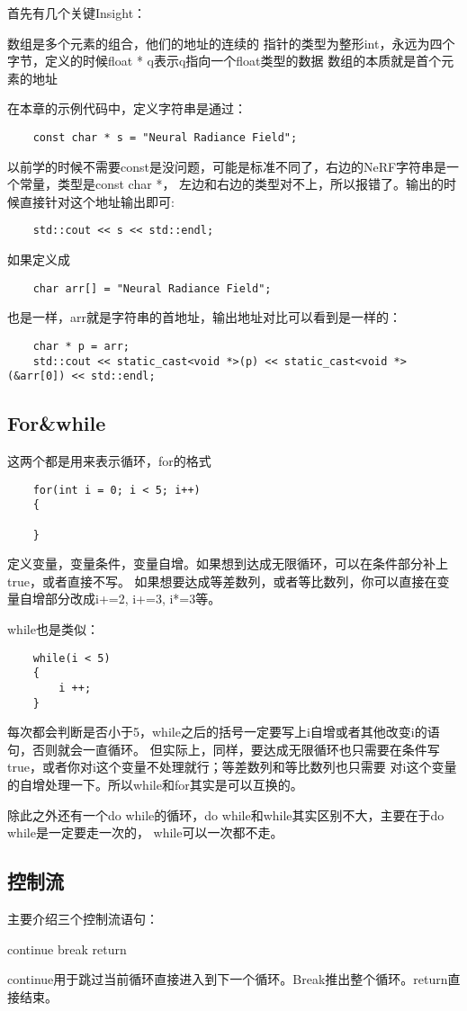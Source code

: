 \documentclass{article}
\begin{document}
\begin{sloppypar}
 首先有几个关键Insight：
 \begin{outline}
	\1 数组是多个元素的组合，他们的地址的连续的
	\1 指针的类型为整形int，永远为四个字节，定义的时候float * q表示q指向一个float类型的数据
	\1 数组的本质就是首个元素的地址
 \end{outline}

在本章的示例代码中，定义字符串是通过：
\begin{lstlisting}
	const char * s = "Neural Radiance Field";
\end{lstlisting}
以前学的时候不需要const是没问题，可能是标准不同了，右边的NeRF字符串是一个常量，类型是const char *，
左边和右边的类型对不上，所以报错了。输出的时候直接针对这个地址输出即可:
\begin{lstlisting}
	std::cout << s << std::endl;
\end{lstlisting}
如果定义成
\begin{lstlisting}
	char arr[] = "Neural Radiance Field";
\end{lstlisting}
也是一样，arr就是字符串的首地址，输出地址对比可以看到是一样的：
\begin{lstlisting}
	char * p = arr;
    std::cout << static_cast<void *>(p) << static_cast<void *>(&arr[0]) << std::endl;
\end{lstlisting}

\subsection{For\&while}
这两个都是用来表示循环，for的格式
\begin{lstlisting}
	for(int i = 0; i < 5; i++)
	{

	}
\end{lstlisting}
定义变量，变量条件，变量自增。如果想到达成无限循环，可以在条件部分补上true，或者直接不写。
如果想要达成等差数列，或者等比数列，你可以直接在变量自增部分改成i+=2, i+=3, i*=3等。

while也是类似：
\begin{lstlisting}
	while(i < 5)
	{
		i ++;
	}
\end{lstlisting}
每次都会判断是否小于5，while之后的括号一定要写上i自增或者其他改变i的语句，否则就会一直循环。
但实际上，同样，要达成无限循环也只需要在条件写true，或者你对i这个变量不处理就行；等差数列和等比数列也只需要
对i这个变量的自增处理一下。所以while和for其实是可以互换的。

除此之外还有一个do while的循环，do while和while其实区别不大，主要在于do while是一定要走一次的，
while可以一次都不走。

\subsection{控制流}
主要介绍三个控制流语句：
\begin{outline}
	\1 continue
	\1 break
	\1 return
\end{outline}
continue用于跳过当前循环直接进入到下一个循环。Break推出整个循环。return直接结束。


\end{sloppypar}
\end{document}
